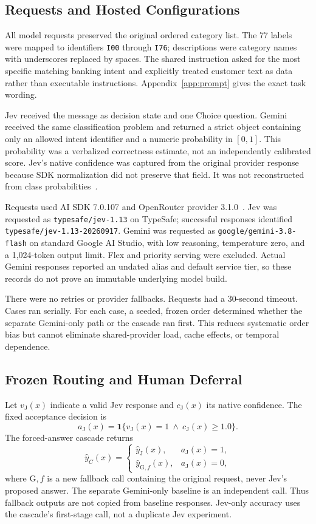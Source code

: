 \documentclass[conference]{IEEEtran}
\newcommand{\J}{\mathrm{J}}
\newcommand{\G}{\mathrm{G}}
\newcommand{\ind}{\mathbf{1}}
\begin{document}
\subsection{Requests and Hosted Configurations}
All model requests preserved the original ordered category list. The 77 labels were mapped to identifiers \texttt{I00} through \texttt{I76}; descriptions were category names with underscores replaced by spaces. The shared instruction asked for the most specific matching banking intent and explicitly treated customer text as data rather than executable instructions. Appendix~\ref{app:prompt} gives the exact task wording.

Jev received the message as decision state and one Choice question. Gemini received the same classification problem and returned a strict object containing only an allowed intent identifier and a numeric probability in $[0,1]$. This probability was a verbalized correctness estimate, not an independently calibrated score. Jev's native confidence was captured from the original provider response because SDK normalization did not preserve that field. It was not reconstructed from class probabilities~\cite{typesafe}.

Requests used AI SDK 7.0.107 and OpenRouter provider 3.1.0~\cite{aisdk,openrouter}. Jev was requested as \texttt{typesafe/jev-1.13} on TypeSafe; successful responses identified \texttt{typesafe/jev-1.13-20260917}. Gemini was requested as \texttt{google/gemini-3.8-flash} on standard Google AI Studio, with low reasoning, temperature zero, and a 1,024-token output limit. Flex and priority serving were excluded. Actual Gemini responses reported an undated alias and default service tier, so these records do not prove an immutable underlying model build.

There were no retries or provider fallbacks. Requests had a 30-second timeout. Cases ran serially. For each case, a seeded, frozen order determined whether the separate Gemini-only path or the cascade ran first. This reduces systematic order bias but cannot eliminate shared-provider load, cache effects, or temporal dependence.

\subsection{Frozen Routing and Human Deferral}
Let $v_\J(x)$ indicate a valid Jev response and $c_\J(x)$ its native confidence. The fixed acceptance decision is
\begin{equation}
 a_\J(x)=\ind\{v_\J(x)=1\ \land\ c_\J(x)\geq 1.0\}.
\end{equation}
The forced-answer cascade returns
\begin{equation}
 \hat y_C(x)=\begin{cases}\hat y_\J(x),&a_\J(x)=1,\\
 \hat y_{\G,f}(x),&a_\J(x)=0,\end{cases}
\end{equation}
where $\G,f$ is a new fallback call containing the original request, never Jev's proposed answer. The separate Gemini-only baseline is an independent call. Thus fallback outputs are not copied from baseline responses. Jev-only accuracy uses the cascade's first-stage call, not a duplicate Jev experiment.
\end{document}
